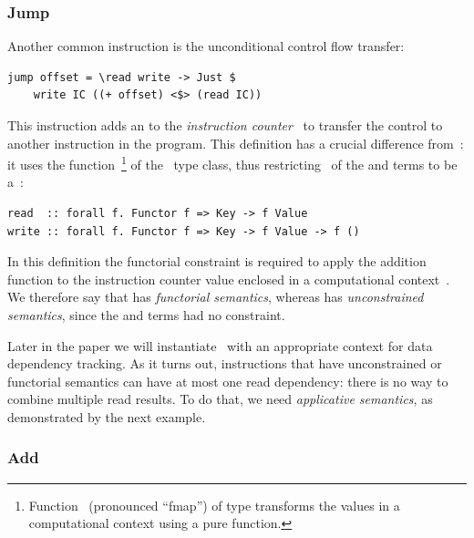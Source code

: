 \subsubsection{Jump}

Another common instruction is the unconditional control flow transfer:

\begin{verbatim}
jump offset = \read write -> Just $
    write IC ((+ offset) <$> (read IC))
\end{verbatim}

\noindent
This instruction adds an  to the \emph{instruction counter}~
to transfer the control to another instruction in the program. This definition
has a crucial difference from~: it uses the
function~\hs{<$>}\footnote{Function~\hs{<$>} (pronounced ``fmap'') of type
 transforms the values in a
computational context  using a pure function.} of the~ type
class, thus restricting~ of the  and  terms to be
a~:

\vspace{-1mm}
\begin{verbatim}
read  :: forall f. Functor f => Key -> f Value
write :: forall f. Functor f => Key -> f Value -> f ()
\end{verbatim}

In this definition the functorial constraint is required to apply the addition
function  to the instruction counter value
enclosed in a computational context~. We therefore say that  has
\emph{functorial semantics}, whereas  has \emph{unconstrained semantics},
since the  and  terms had no constraint.

Later in the paper we will instantiate~ with an appropriate context for
data dependency tracking. As it turns out, instructions that have unconstrained
or functorial semantics can have at most one read dependency: there is no way
to combine multiple read results. To do that, we need \emph{applicative
semantics}, as demonstrated by the next example.

\vspace{-3mm}
\subsubsection{Add}

